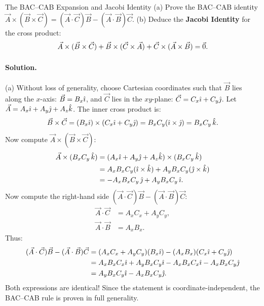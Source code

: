 \begin{workedexample}{The BAC--CAB Expansion and Jacobi Identity}
(a) Prove the BAC--CAB identity $\vec{A}\times(\vec{B}\times\vec{C}) = (\vec{A}\cdot\vec{C})\vec{B} - (\vec{A}\cdot\vec{B})\vec{C}$.
(b) Deduce the \textbf{Jacobi Identity} for the cross product:
\[
\vec{A}\times(\vec{B}\times\vec{C}) + \vec{B}\times(\vec{C}\times\vec{A}) + \vec{C}\times(\vec{A}\times\vec{B}) = \vec{0}.
\]

\paragraph{Solution.}

(a) Without loss of generality, choose Cartesian coordinates such that $\vec{B}$ lies along the $x$-axis: $\vec{B} = B_x\hat{\imath}$, and $\vec{C}$ lies in the $xy$-plane: $\vec{C} = C_x\hat{\imath} + C_y\hat{\jmath}$.
Let $\vec{A} = A_x\hat{\imath} + A_y\hat{\jmath} + A_z\hat{k}$.
The inner cross product is:
\[
\vec{B}\times\vec{C} = (B_x\hat{\imath})\times(C_x\hat{\imath} + C_y\hat{\jmath}) = B_x C_y(\hat{\imath}\times\hat{\jmath}) = B_x C_y\,\hat{k}.
\]
Now compute $\vec{A}\times(\vec{B}\times\vec{C})$:
\begin{align*}
\vec{A}\times(B_x C_y\,\hat{k}) &= (A_x\hat{\imath} + A_y\hat{\jmath} + A_z\hat{k})\times(B_x C_y\,\hat{k}) \\
&= A_x B_x C_y(\hat{\imath}\times\hat{k}) + A_y B_x C_y(\hat{\jmath}\times\hat{k}) \\
&= -A_x B_x C_y\,\hat{\jmath} + A_y B_x C_y\,\hat{\imath}.
\end{align*}
Now compute the right-hand side $(\vec{A}\cdot\vec{C})\vec{B} - (\vec{A}\cdot\vec{B})\vec{C}$:
\begin{align*}
\vec{A}\cdot\vec{C} &= A_x C_x + A_y C_y, \\
\vec{A}\cdot\vec{B} &= A_x B_x.
\end{align*}
Thus:
\begin{align*}
(\vec{A}\cdot\vec{C})\vec{B} - (\vec{A}\cdot\vec{B})\vec{C} &= (A_x C_x + A_y C_y)(B_x\hat{\imath}) - (A_x B_x)(C_x\hat{\imath} + C_y\hat{\jmath}) \\
&= A_x B_x C_x\hat{\imath} + A_y B_x C_y\hat{\imath} - A_x B_x C_x\hat{\imath} - A_x B_x C_y\hat{\jmath} \\
&= A_y B_x C_y\hat{\imath} - A_x B_x C_y\hat{\jmath}.
\end{align*}
Both expressions are identical! Since the statement is coordinate-independent, the BAC--CAB rule is proven in full generality.


\end{workedexample}
